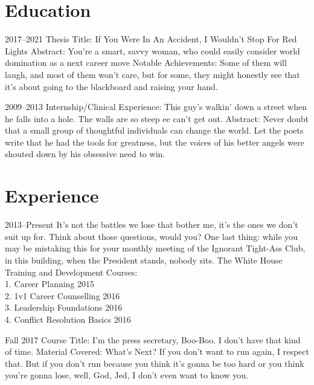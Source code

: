 \documentclass{rmjCV}
\begin{document}
\begin{paracol}{2}
\begin{rightcolumn}

\section{Education}
 {2017--2021}
\experienceitems
{Thesis Title: If You Were In An Accident, I Wouldn't Stop For Red Lights}
{Abstract: You're a smart, savvy woman, who could easily consider world domination as a next career move}
{Notable Achievements: Some of them will laugh, and most of them won't care, but for some, they might honestly see that it's about going to the blackboard and raising your hand.}

 {2009--2013}
\experienceitems
{Internship/Clinical Experience: This guy's walkin' down a street when he falls into a hole. The walls are so steep ee can't get out.}
{Abstract: Never doubt that a small group of thoughtful individuals can change the world.}
{Let the poets write that he had the tools for greatness, but the voices of his better angels were shouted down by his obsessive need to win.}
\section{Experience}
 {2013--Present}
\experienceitems
{It's not the battles we lose that bother me, it's the ones we don't suit up for.}
{Think about those questions, would you? One last thing: while you may be mistaking this for your monthly meeting of the Ignorant Tight-Ass Club, in this building, when the President stands, nobody sits.}
{The White House Training and Development Courses:\\
1. Career Planning 2015\\
2. 1v1 Career Counselling 2016\\
3. Leadership Foundations 2016\\
4. Conflict Resolution Basics 2016}

 {Fall 2017}
\experienceitems
{Course Title: I'm the press secretary, Boo-Boo. I don't have that kind of time.}
{Material Covered: What's Next?}
{If you don't want to run again, I respect that. But if you don't run because you think it's gonna be too hard or you think you're gonna lose, well, God, Jed, I don't even want to know you.}

\end{rightcolumn}
\end{paracol}
\end{document}
